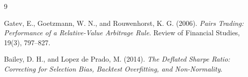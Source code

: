 \documentclass[11pt]{article}
\begin{document}
\begin{thebibliography}{9}

Gatev, E., Goetzmann, W. N., and Rouwenhorst, K. G. (2006).
\textit{Pairs Trading: Performance of a Relative-Value Arbitrage Rule}.
Review of Financial Studies, 19(3), 797--827.

Bailey, D. H., and Lopez de Prado, M. (2014).
\textit{The Deflated Sharpe Ratio: Correcting for Selection Bias,
Backtest Overfitting, and Non-Normality}.

\end{thebibliography}
\end{document}
